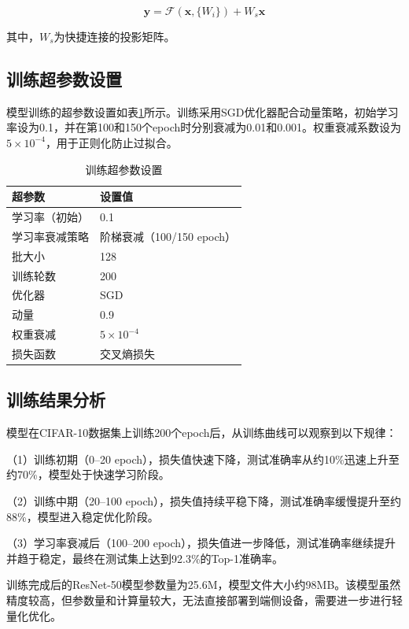 \begin{equation}
	\mathbf{y} = \mathcal{F}(\mathbf{x}, \{W_i\}) + W_s \mathbf{x}
	\label{eq:residual_shortcut}
\end{equation}

其中，$W_s$为快捷连接的投影矩阵。

\subsection{训练超参数设置}

模型训练的超参数设置如表\ref{tab:hyperparams}所示。训练采用SGD优化器配合动量策略，初始学习率设为0.1，并在第100和150个epoch时分别衰减为0.01和0.001。权重衰减系数设为$5\times10^{-4}$，用于正则化防止过拟合。

\begin{table}[htbp]
	\centering
	\caption{训练超参数设置}
	\label{tab:hyperparams}
	\begin{tabular}{ll}
		\toprule
		超参数 & 设置值 \\
		\midrule
		学习率（初始） & 0.1 \\
		学习率衰减策略 & 阶梯衰减（100/150 epoch） \\
		批大小 & 128 \\
		训练轮数 & 200 \\
		优化器 & SGD \\
		动量 & 0.9 \\
		权重衰减 & $5\times10^{-4}$ \\
		损失函数 & 交叉熵损失 \\
		\bottomrule
	\end{tabular}
\end{table}

\subsection{训练结果分析}

模型在CIFAR-10数据集上训练200个epoch后，从训练曲线可以观察到以下规律：

（1）训练初期（0--20 epoch），损失值快速下降，测试准确率从约10\%迅速上升至约70\%，模型处于快速学习阶段。

（2）训练中期（20--100 epoch），损失值持续平稳下降，测试准确率缓慢提升至约88\%，模型进入稳定优化阶段。

（3）学习率衰减后（100--200 epoch），损失值进一步降低，测试准确率继续提升并趋于稳定，最终在测试集上达到92.3\%的Top-1准确率。

训练完成后的ResNet-50模型参数量为25.6M，模型文件大小约98MB。该模型虽然精度较高，但参数量和计算量较大，无法直接部署到端侧设备，需要进一步进行轻量化优化。

